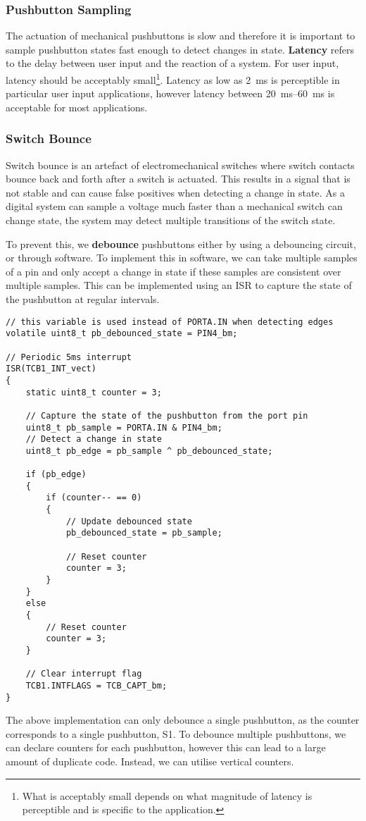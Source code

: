\documentclass{article}
\begin{document}
\subsubsection{Pushbutton Sampling}
The actuation of mechanical pushbuttons is slow and therefore it is
important to sample pushbutton states fast enough to detect changes in
state. \textbf{Latency} refers to the delay between user input and the
reaction of a system. For user input, latency should be acceptably
small\footnote{What is acceptably small depends on what magnitude of
latency is perceptible and is specific to the application.}. Latency as
low as \qty{2}{ms} is perceptible in particular user input
applications, however latency between \qtyrange{20}{60}{ms} is
acceptable for most applications.
\subsubsection{Switch Bounce}
Switch bounce is an artefact of electromechanical switches where switch
contacts bounce back and forth after a switch is actuated. This results
in a signal that is not stable and can cause false positives when
detecting a change in state. As a digital system can sample a voltage
much faster than a mechanical switch can change state, the system may
detect multiple transitions of the switch state.

To prevent this, we \textbf{debounce} pushbuttons either by using a
debouncing circuit, or through software. To implement this in software,
we can take multiple samples of a pin and only accept a change in state
if these samples are consistent over multiple samples. This can be
implemented using an ISR to capture the state of the pushbutton at
regular intervals.
\begin{verbatim}
// this variable is used instead of PORTA.IN when detecting edges
volatile uint8_t pb_debounced_state = PIN4_bm;

// Periodic 5ms interrupt
ISR(TCB1_INT_vect)
{
    static uint8_t counter = 3;

    // Capture the state of the pushbutton from the port pin
    uint8_t pb_sample = PORTA.IN & PIN4_bm;
    // Detect a change in state
    uint8_t pb_edge = pb_sample ^ pb_debounced_state;

    if (pb_edge)
    {
        if (counter-- == 0)
        {
            // Update debounced state
            pb_debounced_state = pb_sample;

            // Reset counter
            counter = 3;
        }
    }
    else
    {
        // Reset counter
        counter = 3;
    }

    // Clear interrupt flag
    TCB1.INTFLAGS = TCB_CAPT_bm;
}
\end{verbatim}
The above implementation can only debounce a single pushbutton, as the
counter corresponds to a single pushbutton, S1. To debounce multiple
pushbuttons, we can declare counters for each pushbutton, however this
can lead to a large amount of duplicate code. Instead, we can utilise
vertical counters.
\end{document}
